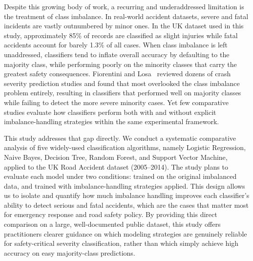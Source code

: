Despite this growing body of work, a recurring and underaddressed limitation is 
the treatment of class imbalance. In real-world accident datasets, severe and 
fatal incidents are vastly outnumbered by minor ones. In the UK dataset used in 
this study, approximately 85\% of records are classified as slight injuries while 
fatal accidents account for barely 1.3\% of all cases. When class imbalance is 
left unaddressed, classifiers tend to inflate overall accuracy by defaulting to 
the majority class, while performing poorly on the minority classes that carry 
the greatest safety consequences. Fiorentini and Losa~\cite{fiorentini2020imbalance} 
reviewed dozens of crash severity prediction studies and found that most 
overlooked the class imbalance problem entirely, resulting in classifiers that 
performed well on majority classes while failing to detect the more severe 
minority cases. Yet few comparative studies evaluate how classifiers perform both 
with and without explicit imbalance-handling strategies within the same 
experimental framework.

This study addresses that gap directly. We conduct a systematic comparative 
analysis of five widely-used classification algorithms, namely Logistic 
Regression, Naive Bayes, Decision Tree, Random Forest, and Support Vector 
Machine, applied to the UK Road Accident dataset (2005--2014). The study plans 
to evaluate each model under two conditions: trained on the original imbalanced 
data, and trained with imbalance-handling strategies applied. This design allows 
us to isolate and quantify how much imbalance handling improves each classifier's 
ability to detect serious and fatal accidents, which are the cases that matter 
most for emergency response and road safety policy. By providing this direct 
comparison on a large, well-documented public dataset, this study offers 
practitioners clearer guidance on which modeling strategies are genuinely 
reliable for safety-critical severity classification, rather than which simply 
achieve high accuracy on easy majority-class predictions.